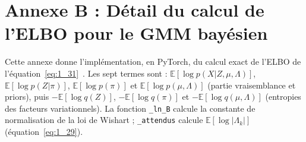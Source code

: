 
\section*{Annexe B : Détail du calcul de l'ELBO pour le GMM bayésien}
Cette annexe donne l'implémentation, en PyTorch, du calcul exact de l'ELBO de l'équation~\eqref{eq:1_31}~\cite[éq.~10.70 à 10.77]{bishop2006}. Les sept termes sont : $\mathbb{E}[\log p(X|Z,\mu ,\Lambda )]$, $\mathbb{E}[\log p(Z|\pi )]$, $\mathbb{E}[\log p(\pi )]$ et $\mathbb{E}[\log p(\mu ,\Lambda )]$ (partie vraisemblance et priors), puis $-\mathbb{E}[\log q(Z)]$, $-\mathbb{E}[\log q(\pi )]$ et $-\mathbb{E}[\log q(\mu ,\Lambda )]$ (entropies des facteurs variationnels). La fonction \texttt{\_ln\_B} calcule la constante de normalisation de la loi de Wishart ; \texttt{\_attendus} calcule $\mathbb{E}[\log |\Lambda _{k}|]$ (équation~\ref{eq:1_29}).

